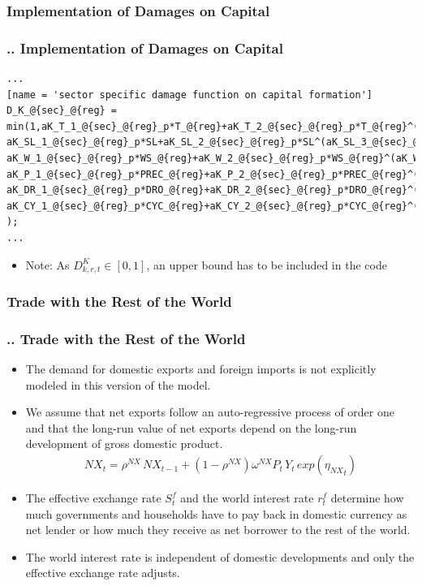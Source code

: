 \documentclass[11pt,aspectratio=169]{beamer}
\begin{document}
\subsubsection{Implementation of Damages on Capital}
\begin{frame}[fragile]
\frametitle{{\thesection.\thesubsection.\thesubsubsection} Implementation of Damages on Capital}

\begin{lstlisting}[frame = single]
...
[name = 'sector specific damage function on capital formation']
D_K_@{sec}_@{reg} = min(1,aK_T_1_@{sec}_@{reg}_p*T_@{reg}+aK_T_2_@{sec}_@{reg}_p*T_@{reg}^(aK_T_3_@{sec}_@{reg}_p)+ 
aK_SL_1_@{sec}_@{reg}_p*SL+aK_SL_2_@{sec}_@{reg}_p*SL^(aK_SL_3_@{sec}_@{reg}_p)+
aK_W_1_@{sec}_@{reg}_p*WS_@{reg}+aK_W_2_@{sec}_@{reg}_p*WS_@{reg}^(aK_W_3_@{sec}_@{reg}_p)+
aK_P_1_@{sec}_@{reg}_p*PREC_@{reg}+aK_P_2_@{sec}_@{reg}_p*PREC_@{reg}^(aK_P_3_@{sec}_@{reg}_p)+
aK_DR_1_@{sec}_@{reg}_p*DRO_@{reg}+aK_DR_2_@{sec}_@{reg}_p*DRO_@{reg}^(aK_DR_3_@{sec}_@{reg}_p)+
aK_CY_1_@{sec}_@{reg}_p*CYC_@{reg}+aK_CY_2_@{sec}_@{reg}_p*CYC_@{reg}^(aK_CY_3_@{sec}_@{reg}_p)
);
...
\end{lstlisting}
\begin{itemize}
	\scriptsize
	\item Note: As $D_{k,r,t}^K \in [0,1]$, an upper bound has to be included in the code
\end{itemize}
\end{frame}




\subsubsection{Trade with the Rest of the World}
\begin{frame}
\frametitle{{\thesection.\thesubsection.\thesubsubsection} Trade with the Rest of the World}
\scriptsize
\begin{itemize}
\item The demand for domestic exports and foreign imports is not explicitly modeled in this version of the model. 
\item We assume that net exports follow an auto-regressive process of order one and that the long-run value of net exports depend on the long-run development of gross domestic product.
\begin{align*}
NX_{t} = \rho^{NX} \, NX_{t-1} + (1 - \rho^{NX}) \omega^{NX} P_{t} \, Y_{t} \, exp\left({{\eta_{NX}}_{t}}\right)
\end{align*}
\item The effective exchange rate $S^f_{t}$ and the world interest rate $r^{f}_{t}$ determine how much governments and households have to pay back in domestic currency as net lender or how much they receive as net borrower to the rest of the world.
 \item The world interest rate is independent of domestic developments and only the effective exchange rate adjusts.
\end{itemize}
\end{frame}
\end{document}
